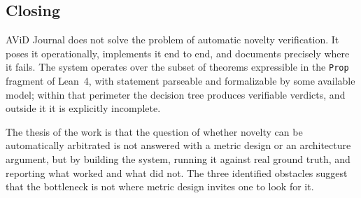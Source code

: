\documentclass[12pt,a4paper]{article}
\theoremstyle{remark}
\begin{document}
\subsection{Closing}

AViD Journal does not solve the problem of automatic novelty verification. It poses it operationally, implements it end to end, and documents precisely where it fails. The system operates over the subset of theorems expressible in the \texttt{Prop} fragment of Lean~4, with statement parseable and formalizable by some available model; within that perimeter the decision tree produces verifiable verdicts, and outside it it is explicitly incomplete.

The thesis of the work is that the question of whether novelty can be automatically arbitrated is not answered with a metric design or an architecture argument, but by building the system, running it against real ground truth, and reporting what worked and what did not. The three identified obstacles suggest that the bottleneck is not where metric design invites one to look for it.
\end{document}
